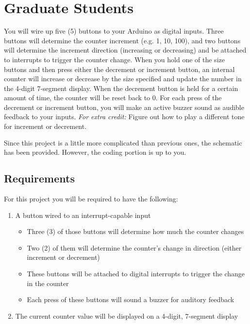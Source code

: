 \section*{Graduate Students} 
You will wire up five (5) buttons to your Arduino as digital inputs.
Three buttons will determine the counter increment (e.g. 1, 10, 100), and two buttons will determine the increment direction (increasing or decreasing) and be attached to interrupts to trigger the counter change.
When you hold one of the size buttons and then press either the decrement or increment button, an internal counter will increase or decrease by the size specified and update the number in the 4-digit 7-segment display.
When the decrement button is held for a certain amount of time, the counter will be reset back to 0.
For each press of the decrement or increment button, you will make an active buzzer sound as audible feedback to your inputs. \emph{For extra credit:} Figure out how to play a different tone for increment or decrement.

Since this project is a little more complicated than previous ones, the schematic has been provided. However, the coding portion is up to you.

    \subsection*{Requirements}
    For this project you will be required to have the following:
    \begin{enumerate}
        \item A button wired to an interrupt-capable input
            \begin{itemize}
                \item Three (3) of those buttons will determine how much the counter changes
                \item Two (2) of them will determine the counter's change in direction (either increment or decrement)
                \item These buttons will be attached to digital interrupts to trigger the change in the counter
                \item Each press of these buttons will sound a buzzer for auditory feedback
            \end{itemize}
        \item The current counter value will be displayed on a 4-digit, 7-segment display
    \end{enumerate}

